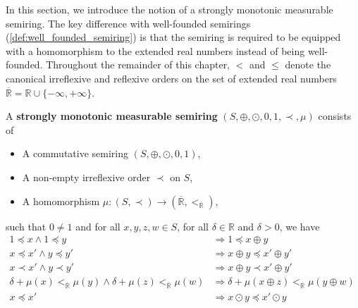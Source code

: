 In this section, we introduce the notion of a strongly monotonic measurable semiring.
The key difference with well-founded semirings (\autoref{def:well_founded_semiring}) is that the semiring is required to be equipped with a homomorphism to the extended real numbers instead of being well-founded.
Throughout the remainder of this chapter, $<$ and $\leq$ denote the canonical irreflexive and reflexive orders on the set of extended real numbers $\overline{\mathbb{R}} = \mathbb{R} \cup \{-\infty, +\infty\}$.
\begin{definition}
    \label{def:real_strongly_monotonic_semiring}
    A \textbf{strongly monotonic measurable semiring} $(S, \oplus, \odot, 0, 1, \prec, \mu)$ consists of
    \begin{itemize} 
        \item A commutative semiring $(S, \oplus, \odot, 0, 1)$,
        \item A non-empty irreflexive order $\prec$ on $S$,
        \item A homomorphism $\mu : (S, \prec) \to ( \overline{\mathbb{R}}, <_{\overline{\mathbb{R}}} )$,
    \end{itemize}
    such that $0 \neq 1$ and for all $x,y,z,w \in S$, for all $\delta \in \mathbb{R}$ and $\delta>0$, we have
        \begin{align*}
            1 \preceq x \land 1 \preceq y 
            &\Rightarrow
            1 \preceq x \oplus y
            &\tag{S0} \label{ax:s0} 
            \\ 
            x \preceq x' \land y \preceq y' 
            &\Rightarrow
            x \oplus y \preceq x' \oplus y'
            &\tag{S1} \label{ax:s1} 
            \\   
            x \prec x' \land y \prec y'  
            &\Rightarrow
            x \oplus y \prec x' \oplus y'
            &\tag{S2} \label{ax:s2} 
            \\
            \delta + \mu(x) <_{\overline{\mathbb{R}}} \mu(y) \land \delta + \mu(z) <_{\overline{\mathbb{R}}} \mu(w)
            &\Rightarrow
            \delta + \mu(x \oplus z) <_{\overline{\mathbb{R}}} \mu(y \oplus w)
            &\tag{S3} \label{ax:s2'}
            \\
            x \preceq x'
            &\Rightarrow 
            x \odot y \preceq x' \odot y 

\end{align*}
\end{definition}

